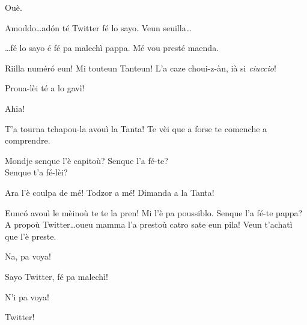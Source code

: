 \begin{drama}
\Tantaspeaks Ouè.



\Alicespeaks Amoddo\ldots ad\'on té Twitter fé lo sayo. Veun seuilla\ldots


\Alicespeaks\ldots fé lo sayo é fé pa malechì pappa. Mé vou presté maenda.


\Tantaspeaks Riilla numér\'o eun! Mi touteun Tanteun! L'a caze choui-z-àn, ià si \textit{ciuccio}!

\Tanteunspeaks Proua-lèi té a lo gavì!


\Twitterspeaks Ahia!


\Tanteunspeaks{} T'a tourna tchapou-la avouì la Tanta! Te vèi que a forse te comenche a comprendre.


\Alicespeaks Mondje senque l'è capitoù?  Senque l'a fé-te?\\  Senque t'a fé-lèi?

\Tanteunspeaks Ara l'è coulpa de mé! Todzor a mé! Dimanda a la Tanta!


\Alicespeaks Eunc\'o avouì le mèinoù te te la pren! Mi l'è pa poussiblo.  Senque l'a fé-te pappa? A propoù Twitter\ldots oueu mamma l'a prestoù catro sate eun pila! Veun t'achatì que l'è preste.

\Twitterspeaks Na, pa voya!

\Alicespeaks{} Sayo Twitter, fé pa malechì!

\Twitterspeaks N'i pa voya!

\Alicespeaks Twitter!


\end{drama}
